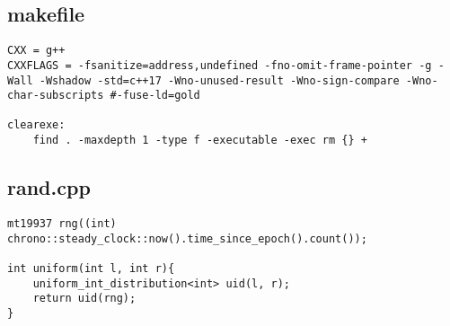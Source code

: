 \documentclass[11pt, a4paper, twoside]{article}
\begin{document}
\subsection{makefile}
\begin{lstlisting}
CXX = g++
CXXFLAGS = -fsanitize=address,undefined -fno-omit-frame-pointer -g -Wall -Wshadow -std=c++17 -Wno-unused-result -Wno-sign-compare -Wno-char-subscripts #-fuse-ld=gold

clearexe:
	find . -maxdepth 1 -type f -executable -exec rm {} +
\end{lstlisting}

\subsection{rand.cpp}
\begin{lstlisting}
mt19937 rng((int) chrono::steady_clock::now().time_since_epoch().count());

int uniform(int l, int r){
	uniform_int_distribution<int> uid(l, r);
	return uid(rng);
}
\end{lstlisting}
\end{document}
